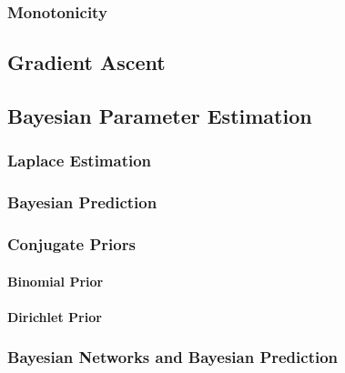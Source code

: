             \subsubsection{Monotonicity} %

        \subsection{Gradient Ascent} %

        \subsection{Bayesian Parameter Estimation} %

            \subsubsection{Laplace Estimation} %

            \subsubsection{Bayesian Prediction} %

            \subsubsection{Conjugate Priors} %

                \paragraph{Binomial Prior} %

                \paragraph{Dirichlet Prior} %

            \subsubsection{Bayesian Networks and Bayesian Prediction} %

